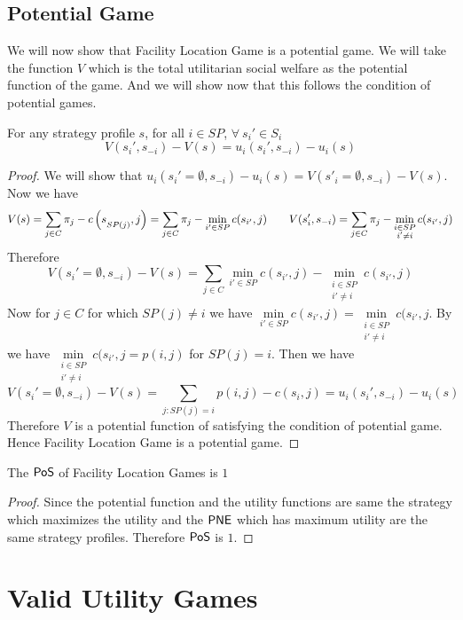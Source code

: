 \subsection{Potential Game}
We will now show that Facility Location Game is a potential game. We will take the function $V$ which is the total utilitarian social welfare as the potential function of the game. And we will show now that this follows the condition of potential games.
\begin{Theorem}{}{}
	For any strategy profile $s$, for all $i\in SP$, $\forall\ s_i'\in S_i$ $$V(s_i',s_{-i})-V(s)=u_i(s_i',s_{-i})-u_i(s)$$
\end{Theorem}
\begin{proof}
	We will show that $u_i(s_i'=\emptyset, s_{-i})-u_i(s)=V(s'_i=\emptyset, s_{-i})-V(s)$. Now we have $$V(s)=\sum\limits_{j\in C} \pi_j-c\left(s\strut_{SP(j)},j\right)=\sum\limits_{j\in C}\pi_j-\min\limits_{i'\in SP}c(s_{i'},j)\qquad V(s_i',s_{-i})=\sum\limits_{j\in C}\pi_j-\min\limits_{\substack{i\in SP\\ i'\neq i}}c(s_{i'},j) $$Therefore $$V(s_i'=\emptyset, s_{-i})-V(s)=\sum\limits_{j\in C}\min\limits_{i'\in SP}c(s_{i'},j)-\min\limits_{\substack{i\in SP\\ i'\neq i}}c(s_{i'},j)$$Now for $j\in C$ for which $SP(j)\neq i$ we have $\min\limits_{i'\in SP}c(s_{i'},j)=\min\limits_{\substack{i\in SP\\ i'\neq i}}c(s_{i'},j$. By  we have $\min\limits_{\substack{i\in SP\\ i'\neq i}}c(s_{i'},j=p(i,j)$ for $SP(j)=i$. Then we have $$V(s_i'=\emptyset, s_{-i})-V(s)=\sum\limits_{j:SP(j)=i}p(i,j)-c(s_i,j)=u_i(s_i',s_{-i})-u_i(s)$$Therefore $V$ is a potential function of satisfying the condition of potential game. Hence Facility Location Game is a potential game.
\end{proof}
\begin{corolary}{}{}
	The $\operatorname{\mathsf{PoS}}$ of Facility Location Games is $1$
\end{corolary}
\begin{proof}
	Since the potential function and the utility functions are same the strategy which maximizes the utility and the $\operatorname{\mathsf{PNE}}$ which has maximum utility are the same strategy profiles. Therefore $\operatorname{\mathsf{PoS}}$ is $1$.
\end{proof}
\section{Valid Utility Games}


